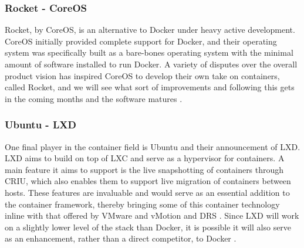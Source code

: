\subsubsection{Rocket - CoreOS}
Rocket, by CoreOS, is an alternative to Docker under heavy active development. CoreOS initially provided complete support for Docker, and their operating system was specifically built as a bare-bones operating system with the minimal amount of software installed to run Docker. A variety of disputes over the overall product vision has inspired CoreOS to develop their own take on containers, called Rocket, and we will see what sort of improvements and following this gets in the coming months and the software matures \cite{rocket}.

\subsubsection{Ubuntu - LXD}
One final player in the container field is Ubuntu and their announcement of LXD. LXD aims to build on top of LXC and serve as a hypervisor for containers. A main feature it aims to support is the live snapshotting of containers through CRIU\cite{CRIU}, which also enables them to support live migration of containers between hosts. These features are invaluable and would serve as an essential addition to the container framework, thereby bringing some of this container technology inline with that offered by VMware and vMotion and DRS \cite{vmotion,DRS}. Since LXD will work on a slightly lower level of the stack than Docker, it is possible it will also serve as an enhancement, rather than a direct competitor, to Docker \cite{lxd}.





